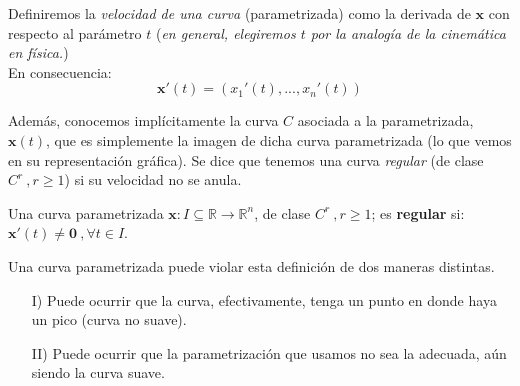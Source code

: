 Definiremos la \emph{velocidad de una curva} (parametrizada) como la derivada de $\mathbf{x}$ con respecto al parámetro $t$ (\emph{en general, elegiremos $t$ por la analogía de la cinemática en física.})\\

En consecuencia:
$$
\mathbf{x'}(t)=(x_1'(t),...,x_n'(t))
$$

Además, conocemos implícitamente la curva $C$ asociada a la parametrizada, $\mathbf{x}(t)$, que es simplemente la imagen de dicha curva parametrizada (lo que vemos en su representación gráfica). 
Se dice que tenemos una curva \emph{regular} (de clase $C^r\ , r\ge 1$) si su velocidad no se anula.\\
\begin{mybox}
    Una curva parametrizada $\mathbf{x}:I\subseteq \mathbb{R} \longrightarrow \mathbb{R}^n$, de clase $C^r \ , r\ge 1$; es \textbf{regular} si: $\mathbf{x'}(t)\neq \mathbf{0}\ , \forall t \in I$.
\end{mybox}

Una curva parametrizada puede violar esta definición de dos maneras distintas.
\begin{enumerate}
    \item[I)] Puede ocurrir que la curva, efectivamente, tenga un punto en donde haya un pico (curva no suave).
    \item[II)] Puede ocurrir que la parametrización que usamos no sea la adecuada, aún siendo la curva suave.
\end{enumerate}

